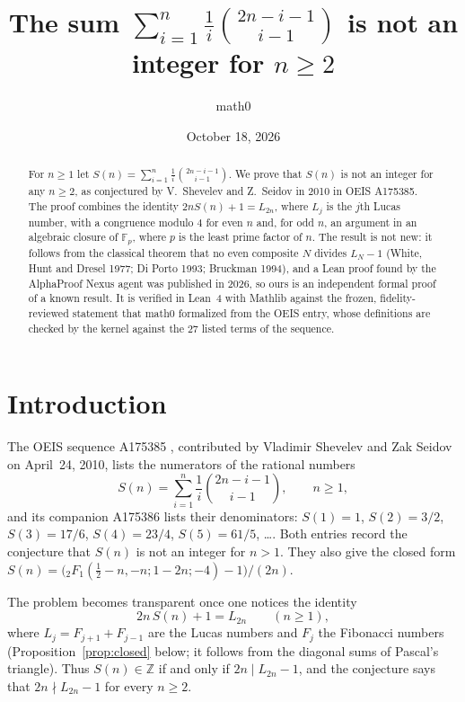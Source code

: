 \documentclass[11pt]{amsart}
\title[Non-integrality of a binomial sum (OEIS A175385)]{The sum $\sum_{i=1}^{n}\frac{1}{i}\binom{2n-i-1}{i-1}$ is not an integer for $n\ge 2$}
\author{math0}
\date{October 18, 2026}
\theoremstyle{plain}
\theoremstyle{definition}
\newcommand{\Z}{\mathbb{Z}}
\newcommand{\F}{\mathbb{F}}
\begin{document}
\begin{abstract}
For $n\ge1$ let $S(n)=\sum_{i=1}^{n}\frac1i\binom{2n-i-1}{i-1}$.
We prove that $S(n)$ is not an integer for any $n\ge2$, as conjectured by V.~Shevelev and Z.~Seidov in 2010 in OEIS A175385.
The proof combines the identity $2nS(n)+1=L_{2n}$, where $L_j$ is the $j$th Lucas number, with a congruence modulo $4$ for even $n$ and, for odd $n$, an argument in an algebraic closure of $\F_p$, where $p$ is the least prime factor of $n$.
The result is not new: it follows from the classical theorem that no even composite $N$ divides $L_N-1$ (White, Hunt and Dresel 1977; Di Porto 1993; Bruckman 1994), and a Lean proof found by the AlphaProof Nexus agent was published in 2026, so ours is an independent formal proof of a known result.
It is verified in Lean~4 with Mathlib against the frozen, fidelity-reviewed statement that math0 formalized from the OEIS entry, whose definitions are checked by the kernel against the $27$ listed terms of the sequence.
\end{abstract}
\maketitle

\section{Introduction}

The OEIS sequence A175385 \cite{A175385}, contributed by Vladimir Shevelev and Zak Seidov on April~24, 2010, lists the numerators of the rational numbers
\[
  S(n)=\sum_{i=1}^{n}\frac{1}{i}\binom{2n-i-1}{i-1},\qquad n\ge1,
\]
and its companion A175386 \cite{A175386} lists their denominators:
$S(1)=1$, $S(2)=3/2$, $S(3)=17/6$, $S(4)=23/4$, $S(5)=61/5$, \dots.
Both entries record the conjecture that $S(n)$ is not an integer for $n>1$.
They also give the closed form $S(n)=\bigl({}_2F_1(\tfrac12-n,-n;1-2n;-4)-1\bigr)/(2n)$.

The problem becomes transparent once one notices the identity
\begin{equation}\label{eq:lucas}
  2n\,S(n)+1=L_{2n}\qquad(n\ge1),
\end{equation}
where $L_j=F_{j+1}+F_{j-1}$ are the Lucas numbers \cite{A000032} and $F_j$ the Fibonacci numbers (Proposition~\ref{prop:closed} below; it follows from the diagonal sums of Pascal's triangle).
Thus $S(n)\in\Z$ if and only if $2n\mid L_{2n}-1$, and the conjecture says that $2n\nmid L_{2n}-1$ for every $n\ge2$.
\end{document}
